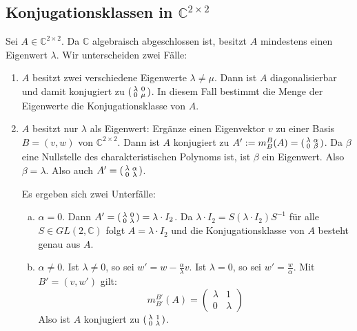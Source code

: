\subsection{Konjugationsklassen in $\mathds{C}^{2 \times 2}$} %
\label{sub:55}
Sei $A \in \mathds{C}^{2 \times 2}$. Da $\mathds{C}$ algebraisch abgeschlossen ist, besitzt $A$ mindestens einen Eigenwert $\lambda$. Wir unterscheiden zwei Fälle:
\begin{enumerate}[1)]
	\item $A$ besitzt zwei verschiedene Eigenwerte $\lambda \not= \mu$. Dann ist $A$ diagonalisierbar und damit konjugiert zu 
	$(\begin{smallmatrix}\lambda  & 0 \\ 0 & \mu \end{smallmatrix})$. In diesem Fall bestimmt die Menge der Eigenwerte die Konjugationsklasse von $A$.
	\item $A$ besitzt nur $\lambda $ als Eigenwert: Ergänze einen Eigenvektor $v$ zu einer Basis $B=(v,w)$ von $\mathds{C}^{2 \times 2}$. Dann ist $A$ konjugiert zu 
	$A' := m_B^B(A) = (\begin{smallmatrix}\lambda  & \alpha \\ 0 & \beta \end{smallmatrix})$. Da $\beta$ eine Nullstelle des charakteristischen Polynoms ist, 
	ist $\beta$ ein Eigenwert. Also $\beta = \lambda $. Also auch $A'  = (\begin{smallmatrix}\lambda  & \alpha \\ 0 & \lambda  \end{smallmatrix})$. 
	
	Es ergeben sich zwei Unterfälle:
	\begin{enumerate}[a)]
		\item $\alpha = 0$. Dann $A' = (\begin{smallmatrix}\lambda  & 0 \\ 0 & \lambda  \end{smallmatrix}) = \lambda \cdot I_2$. Da 
		$\lambda \cdot  I_2 = S (\lambda \cdot I_2) S ^{-1}$ für alle $S \in GL(2,\mathds{C})$ folgt $A=\lambda \cdot I_2$ und die Konjugationsklasse von $A$ besteht 
		genau aus $A$.
		\item $\alpha \not= 0$. Ist $\lambda \not= 0$, so sei $w' = w - \frac{\alpha}{\lambda } v$. Ist $\lambda = 0$, so sei $w'= \frac{w}{\alpha} $. Mit 
		$B'= (v,w')$ gilt:
		\[
			m_{B'}^{B'}(A) = \begin{pmatrix}
				\lambda & 1 \\
				0 & \lambda 
			\end{pmatrix}
		\]
		Also ist $A $ konjugiert zu $(\begin{smallmatrix}\lambda  & 1 \\ 0 & \lambda  \end{smallmatrix})$.
	\end{enumerate}
\end{enumerate}

